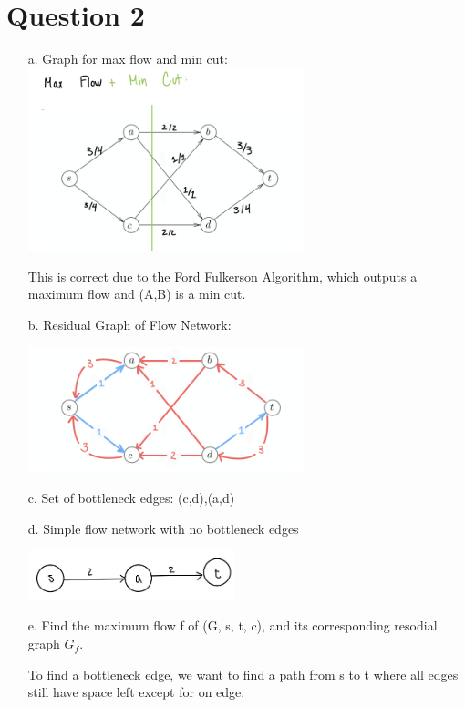 \documentclass[12pt]{article}
\begin{document}
\section*{Question 2}
\begin{enumerate}
    \item[a.] Graph for max flow and min cut:\\
        
        \includegraphics[width=8cm]{Graphs/2A.png}

        This is correct due to the Ford Fulkerson Algorithm, which outputs a maximum flow and (A,B) is a min cut.

    \item[b.]  Residual Graph of Flow Network:

        \includegraphics[width=8cm]{Graphs/2B.png}

    \item[c. ]Set of bottleneck edges: {(c,d),(a,d)}
    \item[d. ] Simple flow network with no bottleneck edges
    
        \includegraphics[width=6cm]{Graphs/2C.png}

    \item[e. ] Find the maximum flow f of (G, s, t, c), and its corresponding resodial
               graph $G_{f}$.
               
               To find a bottleneck edge, we want to find a path from s to t where all edges still
               have space left except for on edge. 
               


\end{enumerate}
\end{document}
